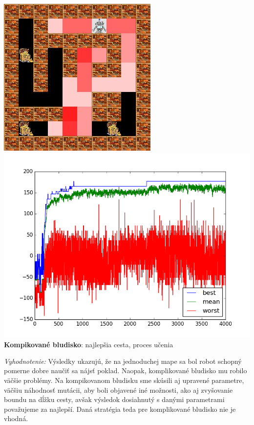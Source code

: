 \documentclass[10pt]{paper}
\begin{document}
\begin{center}
  \includegraphics[scale=0.5]{strategy1_complicated.jpg} 
  \includegraphics[scale=0.38]{strategy1_complicated_graph.png} \\
   \textbf{Kompikované bludisko}: najlepšia cesta, proces učenia
     \end{center}
     
\textit{Vyhodnotenie:} Výsledky ukazujú, že na jednoduchej mape sa bol robot schopný pomerne dobre naučiť sa nájsť poklad. Naopak, komplikované bludisko mu robilo väčšie problémy. Na kompikovanom bludisku sme skúsili aj upravené parametre, väčšiu náhodnosť mutácii, aby boli objavené iné možnosti, ako aj zvyšovanie boundu na dĺžku cesty, avšak výsledok dosiahnutý s danými parametrami považujeme za najlepší. Daná stratégia teda pre komplikované bludisko nie je vhodná. \\
\end{document}
